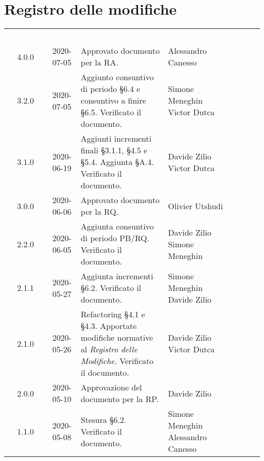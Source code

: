 \section*{Registro delle modifiche}
{
	\centering
	\begin{longtable}{ c c  C{4cm}  C{4cm}  C{3cm} }
		\textcolor{white}{\textbf{Versione}} & \textcolor{white}{\textbf{Data}} & \textcolor{white}{\textbf{Descrizione}} & \textcolor{white}{\textbf{Nominativo}} & \textcolor{white}{\textbf{Ruolo}}\\	
		4.0.0 & 2020-07-05 & Approvato documento per la RA. & Alessandro Canesso & \RdP{} \\ 
		3.2.0 & 2020-07-05 & Aggiunto consuntivo di periodo \S 6.4 e consuntivo a finire \S 6.5. Verificato il documento. & Simone Meneghin \newline Victor Dutca & \Res{} \newline \ver{} \\
		3.1.0 & 2020-06-19 & Aggiunti incrementi finali \S 3.1.1, \S 4.5 e \S 5.4. Aggiunta \S A.4. Verificato il documento. & Davide Zilio \newline Victor Dutca & \Res{} \newline \ver{} \\
		3.0.0 & 2020-06-06 & Approvato documento per la RQ. & Olivier Utshudi & \RdP{} \\
		2.2.0 & 2020-06-05 & Aggiunta consuntivo di periodo PB/RQ. Verificato il documento. & Davide Zilio \newline Simone Meneghin & \Res{} \newline \ver{} \\	
		2.1.1 & 2020-05-27 & Aggiunta incrementi \S 6.2. Verificato il documento. & Simone Meneghin \newline Davide Zilio &\adm{} \newline \ver{} \\
		2.1.0 & 2020-05-26 & Refactoring \S 4.1 e \S 4.3. Apportate modifiche normative al \textit{Registro delle Modifiche}. Verificato il documento. & Davide Zilio \newline Victor Dutca & \adm{} \newline \ver{} \\
		2.0.0 & 2020-05-10 & Approvazione del documento per la RP. & Davide Zilio &\RdP{} \\
		1.1.0 & 2020-05-08 & Stesura \S 6.2. Verificato il documento. & Simone Meneghin \newline Alessandro Canesso &\adm{} \newline \ver{}\\

\end{longtable}}
